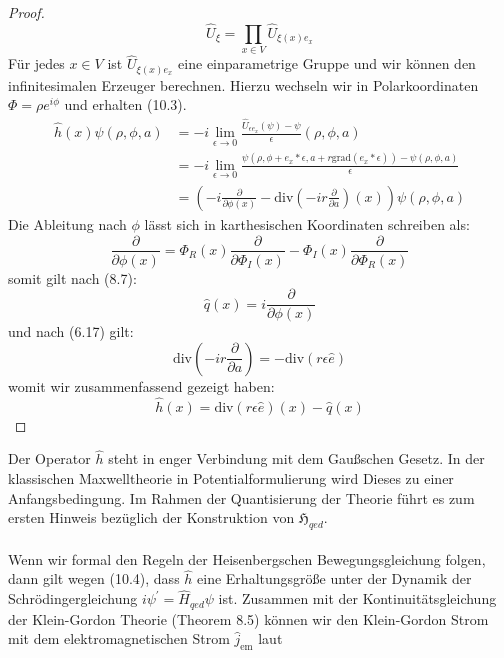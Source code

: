 \documentclass[11pt,a4paper,leqno]{report}
\numberwithin{equation}{chapter}
\begin{document}
\begin{proof}
\begin{equation*}
	\hat{U}_\xi = \prod_{x\in V}\hat{U}_{\xi(x)e_x}
\end{equation*}
F\"ur jedes $x\in V$ ist $\hat{U}_{\xi(x)e_x}$ eine einparametrige Gruppe und wir k\"onnen den infinitesimalen Erzeuger berechnen. Hierzu wechseln wir in Polarkoordinaten $\Phi=\rho e^{i\phi}$ und erhalten (10.3). 
\begin{align*}
	\hat{h}(x)\psi(\rho, \phi, a) &=-i\lim_{\epsilon\rightarrow 0}\frac{\hat{U}_{\epsilon e_x}(\psi)-\psi}{\epsilon}(\rho, \phi, a) \\
	&=-i\lim_{\epsilon\rightarrow 0}\frac{\psi(\rho, \phi + e_x*\epsilon, a + r \text{grad}(e_x*\epsilon))-\psi(\rho, \phi, a)}{\epsilon} \\
	&=(-i\frac{\partial}{\partial\phi(x)}-\text{div}(-ir\frac{\partial}{\partial a})(x))\psi(\rho, \phi, a)
\end{align*}
Die Ableitung nach $\phi$ l\"asst sich in karthesischen Koordinaten schreiben als:
\begin{equation*}
	\frac{\partial}{\partial\phi(x)}=\Phi_{R}(x)\frac{\partial}{\partial \Phi_I(x)}-\Phi_{I}(x)\frac{\partial}{\partial \Phi_R(x)}
\end{equation*}
somit gilt nach (8.7):
\begin{equation*}
	\hat{q}(x)=i\frac{\partial}{\partial\phi(x)}
\end{equation*}
und nach (6.17)  gilt:
\begin{equation*}
	\text{div}(-ir\frac{\partial}{\partial a}) = -\text{div}(r\epsilon \hat{e})
\end{equation*}
womit wir zusammenfassend gezeigt haben:
\begin{equation*}
\hat{h}(x) = \text{div}(r\epsilon \hat{e})(x)-\hat{q}(x)
\end{equation*}

\end{proof}
\noindent
Der Operator $\hat{h}$ steht in enger Verbindung mit dem Gau\ss{}schen Gesetz. In der klassischen Maxwelltheorie in Potentialformulierung wird Dieses zu einer Anfangsbedingung. Im Rahmen der Quantisierung der Theorie f\"uhrt es zum ersten Hinweis bez\"uglich der Konstruktion von $\mathfrak{H}_{qed}$. \\
\\
Wenn wir formal den Regeln der Heisenbergschen Bewegungsgleichung folgen, dann gilt wegen (10.4), dass $\hat{h}$ eine Erhaltungsgr\"o\ss{}e unter der Dynamik der Schr\"odingergleichung $i\psi^\prime=\hat{H}_{qed}\psi$ ist. Zusammen mit der Kontinuit\"atsgleichung der Klein-Gordon Theorie (Theorem 8.5) k\"onnen wir den Klein-Gordon Strom mit dem elektromagnetischen Strom $\hat{j}_{\text{em}}$ laut 
\end{document}
